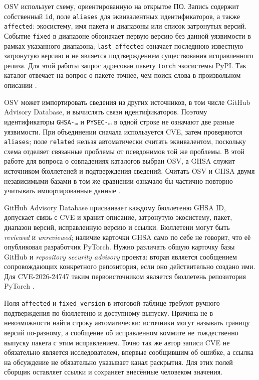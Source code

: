 \documentclass[12pt,a4paper]{report}
\begin{document}
OSV использует схему, ориентированную на открытое ПО. Запись содержит собственный \texttt{id}, поле \texttt{aliases} для эквивалентных идентификаторов, а также \texttt{affected}: экосистему, имя пакета и диапазоны или список затронутых версий. Событие \texttt{fixed} в диапазоне обозначает первую версию без данной уязвимости в рамках указанного диапазона; \texttt{last\_affected} означает последнюю известную затронутую версию и не является подтверждением существования исправленного релиза. Для этой работы запрос адресован пакету \texttt{torch} экосистемы PyPI. Так каталог отвечает на вопрос о пакете точнее, чем поиск слова в произвольном описании \cite{osvschema,osvapi}.

OSV может импортировать сведения из других источников, в том числе GitHub Advisory Database, и вычислять связи идентификаторов. Поэтому идентификаторы \texttt{GHSA-\ldots} и \texttt{PYSEC-\ldots} в одной строке не означают две разные уязвимости. При объединении сначала используется CVE, затем проверяются \texttt{aliases}; поле \texttt{related} нельзя автоматически считать эквивалентом, поскольку схема отделяет связанные проблемы от псевдонимов той же проблемы. В этой работе для вопроса о совпадениях каталогов выбран OSV, а GHSA служит источником бюллетеней и подтверждения сведений. Считать OSV и GHSA двумя независимыми базами в том же сравнении означало бы частично повторно учитывать импортированные данные \cite{osvschema,osvdata}.

GitHub Advisory Database присваивает каждому бюллетеню GHSA ID, допускает связь с CVE и хранит описание, затронутую экосистему, пакет, диапазон версий, исправленную версию и ссылки. Бюллетени могут быть \emph{reviewed} и \emph{unreviewed}; наличие карточки GHSA само по себе не говорит, что её опубликовал разработчик PyTorch. Нужно различать общую карточку базы GitHub и \emph{repository security advisory} проекта: вторая является сообщением сопровождающих конкретного репозитория, если оно действительно создано ими. Для CVE-2026-24747 таким первоисточником является бюллетень репозитория PyTorch \cite{ghsadocs,ghsarepo,ghsa}.

Поля \texttt{affected} и \texttt{fixed\_version} в итоговой таблице требуют ручного подтверждения по бюллетеню и доступному выпуску. Причина не в невозможности найти строку автоматически: источники могут называть границу версий по-разному, а сообщение об исправленном коммите не тождественно выпуску пакета с этим исправлением. Точно так же автор записи CVE не обязательно является исследователем, впервые сообщившим об ошибке, а ссылка на обсуждение не обязательно указывает канал раскрытия. Для этих полей сборщик оставляет ссылки и сохраняет внесённые человеком значения.
\end{document}
